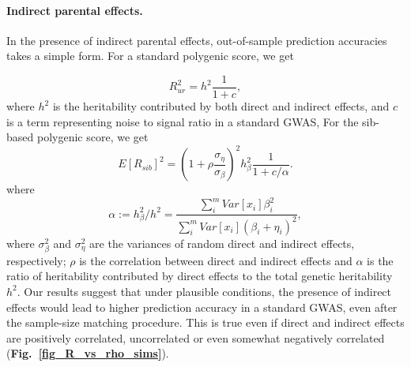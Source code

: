 \documentclass[hidelinks, 12pt]{article}
\begin{document}
\paragraph{Indirect parental effects.}  In the presence of indirect parental effects, out-of-sample prediction accuracies takes a simple form. For a standard polygenic score, we get

$$R_{ur}^2 = h^2\frac{1}{1+c},$$ where $h^2$ is the heritability contributed by both direct and indirect effects, and $c$ is a term representing noise to signal ratio in a standard GWAS,  For the sib-based polygenic score, we get
\begin{equation}
E[R_{sib}]^2 = (1+\rho \frac{\sigma_\eta}{\sigma_\beta})^2 h_\beta^2 \frac{1}{1 + c/\alpha}.
\end{equation} where
$$\alpha := h_\beta^2 / h^2=  \frac{\sum_i^mVar[x_i]\beta_i^2}{\sum_i^mVar[x_i](\beta_i+\eta_i)^2},$$ where $\sigma_\beta^2$ and $\sigma_\eta^2$ are the variances of random direct and indirect effects, respectively; $\rho$ is the correlation between direct and indirect effects and $\alpha$ is the ratio of heritability contributed by direct effects to the total genetic heritability $h^2$.  Our results suggest that under plausible conditions, the presence of indirect effects would lead to higher prediction accuracy in a standard GWAS,  even after the sample-size matching procedure.  This is true even if direct and indirect effects are positively correlated, uncorrelated or even somewhat negatively correlated ({\bf Fig.~\ref{fig_R_vs_rho_sims}}).
\end{document}
